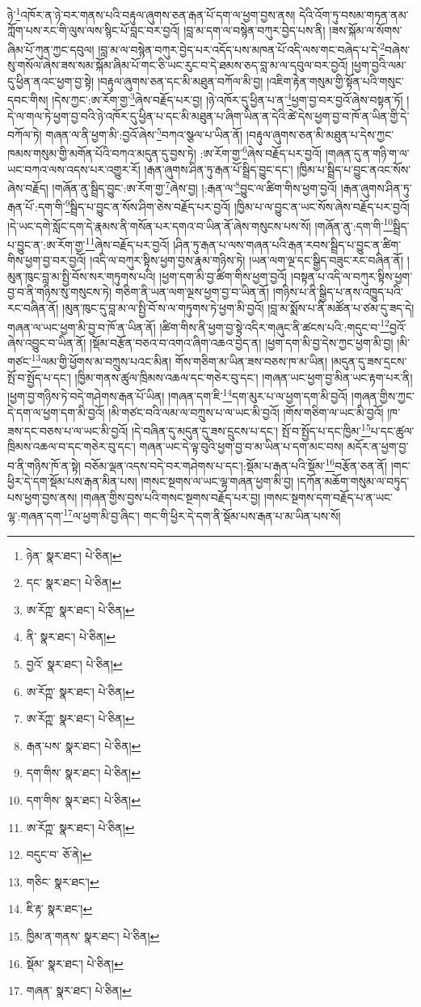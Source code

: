 ཉེ་\footnote{ཉེན་  སྣར་ཐང་།  པེ་ཅིན། }འཁོར་ན་ཉེ་བར་གནས་པའི་བརྟུལ་ཞུགས་ཅན་རྒན་པོ་དག་ལ་ཕྱག་བྱས་ནས། དེའི་འོག་ཏུ་བསམ་གཏན་ནམ་ཀློག་པས་རང་གི་ལུས་ལས་སྙིང་པོ་བླང་བར་བྱའོ། །བླ་མ་དག་ལ་བསྙེན་བཀུར་བྱེད་པས་ནི། །ཟས་སྐོམ་ལ་སོགས་ཞིམ་པོ་ཀུན་ཀྱང་དབུལ། །བླ་མ་ལ་བསྙེན་བཀུར་བྱེད་པར་འདོད་པས་མཁན་པོ་འདི་ལས་གང་བཞེད་པ་དེ་\footnote{དང་  སྣར་ཐང་།  པེ་ཅིན། }བཞེས་སུ་གསོལ་ཞེས་ཟས་སམ་སྐོམ་ཞིམ་པོ་གང་ཅི་ཡང་རུང་བ་དེ་ཐམས་ཅད་བླ་མ་ལ་དབུལ་བར་བྱའོ། །ཕྱག་བྱའི་ལམ་དུ་ཕྱིན་ནའང་ཕྱག་བྱ་སྟེ། །བརྟུལ་ཞུགས་ཅན་དང་མི་མཐུན་བཀོལ་མི་བྱ། །འཇིག་རྟེན་གསུམ་གྱི་སྟོན་པའི་གསུང་དབང་གིས། །དེས་ཀྱང་:ཨ་རོག་གྱ་\footnote{ཨ་རོཀྵ་  སྣར་ཐང་།  པེ་ཅིན། }ཞེས་བརྗོད་པར་བྱ། །ཉེ་འཁོར་དུ་ཕྱིན་པ་ན་\footnote{ནི་  སྣར་ཐང་།  པེ་ཅིན། }ཕྱག་བྱ་བར་བྱའོ་ཞེས་བསྟན་ཏོ། །དེ་ལ་གལ་ཏེ་ཕྱག་བྱ་བའི་ཉེ་འཁོར་དུ་ཕྱིན་པ་དང་མི་མཐུན་པ་ཞིག་ཡིན་ན་དེའི་ཚེ་དེས་ཕྱག་བྱ་བ་ཁོ་ན་ཡིན་གྱི་དེ་བཀོལ་ཏེ། གཞན་ལ་ནི་ཕྱག་མི་:བྱའོ་ཞེས་\footnote{བྱའོ་  སྣར་ཐང་།  པེ་ཅིན། }བཀའ་སྩལ་པ་ཡིན་ནོ། །བརྟུལ་ཞུགས་ཅན་མི་མཐུན་པ་དེས་ཀྱང་ཁམས་གསུམ་གྱི་མགོན་པོའི་བཀའ་མདུན་དུ་བྱས་ཏེ། :ཨ་རོག་གྱ་\footnote{ཨ་རོཀྵ་  སྣར་ཐང་།  པེ་ཅིན། }ཞེས་བརྗོད་པར་བྱའོ། །གཞན་དུ་ན་གཉི་ག་ལ་ཡང་བཀའ་ལས་འདས་པར་འགྱུར་རོ། །རྒན་ཞུགས་ཤིན་ཏུ་རྒན་པོ་སྦྲིད་བྱུང་དང་། །ཁྱིམ་པ་སྦྲིད་པ་བྱུང་ནའང་སོས་ཞེས་བརྗོད། །གཞོན་ནུ་སྦྲིད་བྱུང་:ཨ་རོག་གྱ་\footnote{ཨ་རོཀྵ་  སྣར་ཐང་།  པེ་ཅིན། }ཞེས་བྱ། །:རྒན་ལ་\footnote{རྒན་པས་  སྣར་ཐང་།  པེ་ཅིན། }བྱུང་ལ་ཚིག་གིས་ཕྱག་བྱའོ། །རྒན་ཞུགས་ཤིན་ཏུ་རྒན་པོ་:དག་གི་\footnote{དག་གིས་  སྣར་ཐང་།  པེ་ཅིན། }སྦྲིད་པ་བྱུང་ན་སོས་ཤིག་ཅེས་བརྗོད་པར་བྱའོ། །ཁྱིམ་པ་ལ་བྱུང་ན་ཡང་སོས་ཞེས་བརྗོད་པར་བྱའོ། །དེ་ཡང་དགེ་སློང་དག་དེ་རྣམས་ནི་གསོན་པར་དགའ་བ་ཡིན་ནོ་ཞེས་གསུངས་པས་སོ། །གཞོན་ནུ་:དག་གི་\footnote{དག་གིས་  སྣར་ཐང་།  པེ་ཅིན། }སྦྲིད་པ་བྱུང་ན་:ཨ་རོག་གྱ་\footnote{ཨ་རོཀྵ་  སྣར་ཐང་།  པེ་ཅིན། }ཞེས་བརྗོད་པར་བྱའོ། །ཤིན་ཏུ་རྒན་པ་ལས་གཞན་པའི་རྒན་རབས་སྦྲིད་པ་བྱུང་ན་ཚིག་གིས་ཕྱག་བྱ་བར་བྱའོ། །འདི་ལ་བཀུར་སྟིས་ཕྱག་བྱས་རྣམ་གཉིས་ཏེ། །ཡན་ལག་ལྔ་དང་སྒྱིད་བཟུང་རང་བཞིན་ནོ། །མུན་ཁུང་བླ་མ་སྤྱི་བོས་སར་གཏུགས་པའི། །ཕྱག་དག་མི་བྱ་ཚིག་གིས་ཕྱག་བྱའོ། །བསྟན་པ་འདི་ལ་བཀུར་སྟིས་ཕྱག་བྱ་བ་ནི་གཉིས་སུ་གསུངས་ཏེ། གཅིག་ནི་ཡན་ལག་ལྔས་ཕྱག་བྱ་བ་ཡིན་ནོ། །གཉིས་པ་ནི་སྒྱིད་པ་ནས་འཁྱུད་པའི་རང་བཞིན་ནོ། །མུན་ཁུང་དུ་བླ་མ་ལ་སྤྱི་བོ་ས་ལ་གཏུགས་ཏེ་ཕྱག་མི་བྱའོ། །བླ་མ་སྨོས་པ་ནི་མཚོན་པ་ཙམ་དུ་ཟད་དེ། གཞན་ལ་ཡང་ཕྱག་མི་བྱ་བ་ཁོ་ན་ཡིན་ནོ། །ཚིག་གིས་ནི་ཕྱག་བྱ་སྟེ་འདིར་གཞུང་ནི་ཚངས་པའི་:གདུང་བ་\footnote{བདུང་བ་  ཅོ་ནེ། }བྱའོ་ཞེས་འབྱུང་བ་ཡིན་ནོ། །སྡོམ་བརྩོན་བཅའ་བ་འགའ་ཞིག་འཆའ་བྱེད་ན། །ཕྱག་དག་མི་བྱ་དེས་ཀྱང་ཕྱག་མི་བྱ། །མི་གཙང་\footnote{གཅིང་  སྣར་ཐང་། }ལམ་གྱི་ཕྱོགས་མ་བཀྲུས་པའང་མིན། གོས་གཅིག་མ་ཡིན་ཟས་བཅས་ཁ་མ་ཡིན། །མདུན་དུ་ཟས་དྲངས་སྤོ་བ་སྤྱོད་པ་དང་། །ཁྱིམ་གནས་ཚུལ་ཁྲིམས་འཆལ་དང་གཅེར་བུ་དང་། །གཞན་ཡང་ཕྱག་བྱ་མིན་ཡང་རྟག་པར་ནི། །ཕྱག་བྱ་གཉིས་ཏེ་བདེ་གཤེགས་རྒན་པོ་ཡིན། །གཞན་དག་ཇི་\footnote{ཇི་རྟ་  སྣར་ཐང་། }དག་མུར་པ་ལ་ཕྱག་དག་མི་བྱའོ། །གཞན་གྱིས་ཀྱང་དེ་དག་ལ་ཕྱག་དག་མི་བྱའོ། །མི་གཙང་བའི་ལམ་ལ་བཀྲུས་པ་ལ་ཡང་མི་བྱའོ། །གོས་གཅིག་ལ་ཡང་མི་བྱའོ། །ཁ་ཟས་དང་བཅས་པ་ལ་ཡང་མི་བྱའོ། །དེ་བཞིན་དུ་མདུན་དུ་ཟས་དྲུངས་པ་དང་། སྤོ་བ་སྤྱོད་པ་དང་ཁྱིམ་\footnote{ཁྱིམ་ན་གནས་  སྣར་ཐང་།  པེ་ཅིན། }པ་དང་ཚུལ་ཁྲིམས་འཆལ་བ་དང་གཅེར་བུ་དང་། གཞན་ཡང་དེ་ལྟ་བུའི་ཕྱག་བྱ་བ་མ་ཡིན་པ་དག་མང་བས། མདོར་ན་ཕྱག་བྱ་བ་ནི་གཉིས་ཁོ་ན་སྟེ། བཅོམ་ལྡན་འདས་བདེ་བར་གཤེགས་པ་དང་།:སྡོམ་པ་རྒན་པའི་སྡོམ་\footnote{སྡོམ་  སྣར་ཐང་།  པེ་ཅིན། }བརྩོན་ཅན་ནོ། །གང་ཕྱིར་དེ་དག་སྡོམ་པས་རྒན་མིན་པས། །གསང་སྔགས་ལ་ཡང་ལྷ་གཞན་ཕྱག་མི་བྱ། །དཀོན་མཆོག་གསུམ་ལ་བཏུད་པས་ཕྱག་བྱས་ནས། །གཞན་གྱིས་བྱས་པའི་གསང་སྔགས་བརྗོད་པར་བྱ། །གསང་སྔགས་དག་བརྗོད་པ་ན་ཡང་ལྷ་:གཞན་དག་\footnote{གཞན་  སྣར་ཐང་།  པེ་ཅིན། }ལ་ཕྱག་མི་བྱ་ཞིང་། གང་གི་ཕྱིར་དེ་དག་ནི་སྡོམ་པས་རྒན་པ་མ་ཡིན་པས་སོ། 
